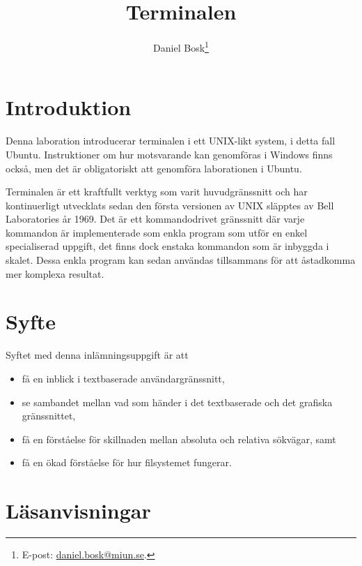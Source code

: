 \documentclass[a4paper]{miunasgn}
\title{Terminalen}
\author{Daniel Bosk\footnote{%
	E-post: \href{mailto:daniel.bosk@miun.se}{daniel.bosk@miun.se}.
}}
\date{\svnId}
\begin{document}
\maketitle
\thispagestyle{foot}
\tableofcontents


\section{Introduktion}
\label{sec:Introduktion}
\noindent
Denna laboration introducerar terminalen i ett UNIX-likt system, i detta fall 
Ubuntu.
Instruktioner om hur motsvarande kan genomföras i Windows finns också, men det 
är obligatoriskt att genomföra laborationen i Ubuntu.

Terminalen är ett kraftfullt verktyg som varit huvudgränssnitt och har 
kontinuerligt utvecklats sedan den första versionen av UNIX släpptes av Bell 
Laboratories år 1969.
Det är ett kommandodrivet gränssnitt där varje kommandon är implementerade som 
enkla program som utför en enkel specialiserad uppgift, det finns dock enstaka 
kommandon som är inbyggda i skalet.
Dessa enkla program kan sedan användas tillsammans för att åstadkomma mer 
komplexa resultat.


\section{Syfte}
\label{sec:Syfte}
\noindent
Syftet med denna inlämningsuppgift är att
\begin{itemize}
	\item få en inblick i textbaserade användargränssnitt,
	\item se sambandet mellan vad som händer i det textbaserade och det
		grafiska gränssnittet,
	\item få en förståelse för skillnaden mellan absoluta och relativa
		sökvägar, samt
	\item få en ökad förståelse för hur filsystemet fungerar.
\end{itemize}


\section{Läsanvisningar}
\label{sec:Lasanvisningar}
\noindent

\end{document}
